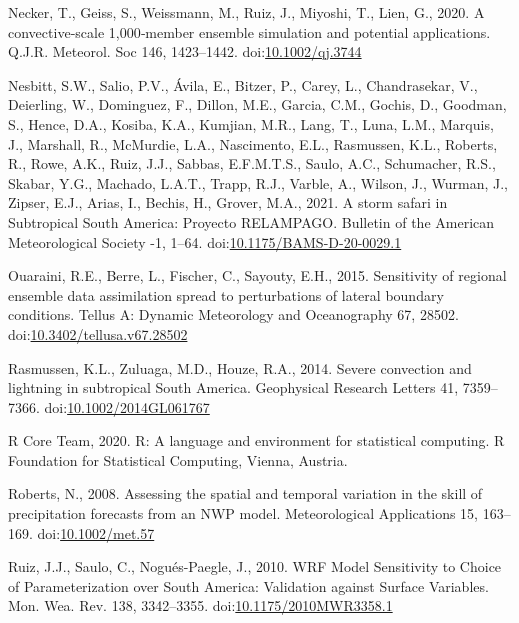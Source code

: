 \documentclass[final,5p,times,twocolumn,authoryear]{elsarticle} %
\begin{document}
\leavevmode\hypertarget{ref-necker2020}{}%
Necker, T., Geiss, S., Weissmann, M., Ruiz, J., Miyoshi, T., Lien, G., 2020. A convective‐scale 1,000‐member ensemble simulation and potential applications. Q.J.R. Meteorol. Soc 146, 1423--1442. doi:\href{https://doi.org/10.1002/qj.3744}{10.1002/qj.3744}

\leavevmode\hypertarget{ref-nesbitt2021}{}%
Nesbitt, S.W., Salio, P.V., Ávila, E., Bitzer, P., Carey, L., Chandrasekar, V., Deierling, W., Dominguez, F., Dillon, M.E., Garcia, C.M., Gochis, D., Goodman, S., Hence, D.A., Kosiba, K.A., Kumjian, M.R., Lang, T., Luna, L.M., Marquis, J., Marshall, R., McMurdie, L.A., Nascimento, E.L., Rasmussen, K.L., Roberts, R., Rowe, A.K., Ruiz, J.J., Sabbas, E.F.M.T.S., Saulo, A.C., Schumacher, R.S., Skabar, Y.G., Machado, L.A.T., Trapp, R.J., Varble, A., Wilson, J., Wurman, J., Zipser, E.J., Arias, I., Bechis, H., Grover, M.A., 2021. A storm safari in Subtropical South America: Proyecto RELAMPAGO. Bulletin of the American Meteorological Society -1, 1--64. doi:\href{https://doi.org/10.1175/BAMS-D-20-0029.1}{10.1175/BAMS-D-20-0029.1}

\leavevmode\hypertarget{ref-ouaraini2015}{}%
Ouaraini, R.E., Berre, L., Fischer, C., Sayouty, E.H., 2015. Sensitivity of regional ensemble data assimilation spread to perturbations of lateral boundary conditions. Tellus A: Dynamic Meteorology and Oceanography 67, 28502. doi:\href{https://doi.org/10.3402/tellusa.v67.28502}{10.3402/tellusa.v67.28502}

\leavevmode\hypertarget{ref-rasmussen2014}{}%
Rasmussen, K.L., Zuluaga, M.D., Houze, R.A., 2014. Severe convection and lightning in subtropical South America. Geophysical Research Letters 41, 7359--7366. doi:\href{https://doi.org/10.1002/2014GL061767}{10.1002/2014GL061767}

\leavevmode\hypertarget{ref-rcoreteam2020}{}%
R Core Team, 2020. R: A language and environment for statistical computing. R Foundation for Statistical Computing, Vienna, Austria.

\leavevmode\hypertarget{ref-roberts2008}{}%
Roberts, N., 2008. Assessing the spatial and temporal variation in the skill of precipitation forecasts from an NWP model. Meteorological Applications 15, 163--169. doi:\href{https://doi.org/10.1002/met.57}{10.1002/met.57}

\leavevmode\hypertarget{ref-ruiz2010}{}%
Ruiz, J.J., Saulo, C., Nogués-Paegle, J., 2010. WRF Model Sensitivity to Choice of Parameterization over South America: Validation against Surface Variables. Mon. Wea. Rev. 138, 3342--3355. doi:\href{https://doi.org/10.1175/2010MWR3358.1}{10.1175/2010MWR3358.1}
\end{document}
